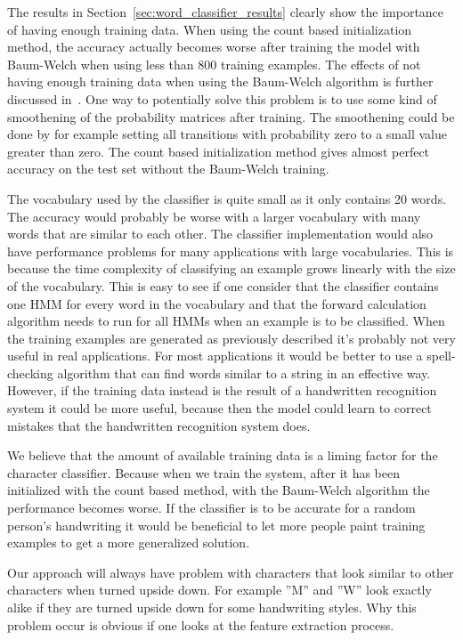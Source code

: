 The results in Section~\ref{sec:word_classifier_results} clearly show the importance of having enough training data.
When using the count based initialization method, the accuracy actually becomes worse after training the model with Baum-Welch when using less than 800 training examples.
The effects of not having enough training data when using the Baum-Welch algorithm is further discussed in~\cite{Rabiner1989}.
One way to potentially solve this problem is to use some kind of smoothening of the probability matrices after training.
The smoothening could be done by for example setting all transitions with probability zero to a small value greater than zero.
The count based initialization method gives almost perfect accuracy on the test set without the Baum-Welch training.

The vocabulary used by the classifier is quite small as it only contains 20 words.
The accuracy would probably be worse with a larger vocabulary with many words that are similar to each other.
The classifier implementation would also have performance problems for many applications with large vocabularies.
This is because the time complexity of classifying an example grows linearly with the size of the vocabulary.
This is easy to see if one consider that the classifier contains one HMM for every word in the vocabulary and that the forward calculation algorithm needs to run for all HMMs when an example is to be classified.
When the training examples are generated as previously described it's probably not very useful in real applications.
For most applications it would be better to use a spell-checking algorithm that can find words similar to a string in an effective way.
However, if the training data instead is the result of a handwritten recognition system it could be more useful, because then the model could learn to correct mistakes that the handwritten recognition system does.

We believe that the amount of available training data is a liming factor for the character classifier.
Because when we train the system, after it has been initialized with the count based method, with the Baum-Welch algorithm the performance becomes worse.
If the classifier is to be accurate for a random person's handwriting it would be beneficial to let more people paint training examples to get a more generalized solution.

Our approach will always have problem with characters that look similar to other characters when turned upside down.
For example ''M'' and ''W'' look exactly alike if they are turned upside down for some handwriting styles.
Why this problem occur is obvious if one looks at the feature extraction process.
